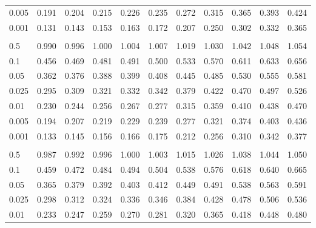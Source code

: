 \documentclass[
]{article}
\begin{document}
\begin{longtable}[t]{lrrrrrrrrrr}
\hspace{1em}0.005 & 0.191 & 0.204 & 0.215 & 0.226 & 0.235 & 0.272 & 0.315 & 0.365 & 0.393 & 0.424\\
\hspace{1em}0.001 & 0.131 & 0.143 & 0.153 & 0.163 & 0.172 & 0.207 & 0.250 & 0.302 & 0.332 & 0.365\\
\addlinespace[0.3em]
\multicolumn{11}{l}{\textbf{$k_2=13$}}\\
\hspace{1em}0.5 & 0.990 & 0.996 & 1.000 & 1.004 & 1.007 & 1.019 & 1.030 & 1.042 & 1.048 & 1.054\\
\hspace{1em}0.1 & 0.456 & 0.469 & 0.481 & 0.491 & 0.500 & 0.533 & 0.570 & 0.611 & 0.633 & 0.656\\
\hspace{1em}0.05 & 0.362 & 0.376 & 0.388 & 0.399 & 0.408 & 0.445 & 0.485 & 0.530 & 0.555 & 0.581\\
\hspace{1em}0.025 & 0.295 & 0.309 & 0.321 & 0.332 & 0.342 & 0.379 & 0.422 & 0.470 & 0.497 & 0.526\\
\hspace{1em}0.01 & 0.230 & 0.244 & 0.256 & 0.267 & 0.277 & 0.315 & 0.359 & 0.410 & 0.438 & 0.470\\
\hspace{1em}0.005 & 0.194 & 0.207 & 0.219 & 0.229 & 0.239 & 0.277 & 0.321 & 0.374 & 0.403 & 0.436\\
\hspace{1em}0.001 & 0.133 & 0.145 & 0.156 & 0.166 & 0.175 & 0.212 & 0.256 & 0.310 & 0.342 & 0.377\\
\addlinespace[0.3em]
\multicolumn{11}{l}{\textbf{$k_2=14$}}\\
\hspace{1em}0.5 & 0.987 & 0.992 & 0.996 & 1.000 & 1.003 & 1.015 & 1.026 & 1.038 & 1.044 & 1.050\\
\hspace{1em}0.1 & 0.459 & 0.472 & 0.484 & 0.494 & 0.504 & 0.538 & 0.576 & 0.618 & 0.640 & 0.665\\
\hspace{1em}0.05 & 0.365 & 0.379 & 0.392 & 0.403 & 0.412 & 0.449 & 0.491 & 0.538 & 0.563 & 0.591\\
\hspace{1em}0.025 & 0.298 & 0.312 & 0.324 & 0.336 & 0.346 & 0.384 & 0.428 & 0.478 & 0.506 & 0.536\\
\hspace{1em}0.01 & 0.233 & 0.247 & 0.259 & 0.270 & 0.281 & 0.320 & 0.365 & 0.418 & 0.448 & 0.480\\

\end{longtable}
\end{document}
